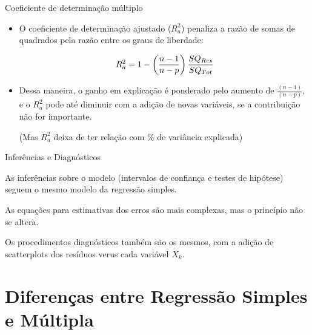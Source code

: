 \documentclass{beamer}\usepackage[]{graphicx}\usepackage[]{color}
\begin{document}
\begin{frame}{Coeficiente de determinação múltiplo}

\begin{itemize}

\item O coeficiente de determinação ajustado ($R^2_a$) penaliza a razão de somas de quadrados pela razão entre os graus de liberdade:

\begin{equation*}
\centering
R ^2 _a = 1 - \left(\frac{n-1}{n-p}\right) \frac{SQ_{Res}}{SQ_{Tot}}

\end{equation*}

\pause
\item Dessa maneira, o ganho em explicação é ponderado pelo aumento de $\frac{(n-1)}{(n-p)}$, e o $R^2_a$ pode até diminuir com a adição de novas variáveis, se a contribuição não for importante.

\vfill

(Mas $R^2_a$ deixa de ter relação com \% de variância explicada)

\end{itemize}

\end{frame}


\begin{frame}{Inferências e Diagnósticos}

As inferências sobre o modelo (intervalos de confiança e testes de hipótese) seguem o mesmo modelo da regressão simples.

\vfill
As equações para estimativas dos erros são mais complexas, mas o princípio não se altera.

\vfill
Os procedimentos diagnósticos também são os mesmos, com a adição de scatterplots dos resíduos verus cada variável $X_k$.

\end{frame}

\section{Diferenças entre Regressão Simples e Múltipla}
\end{document}
